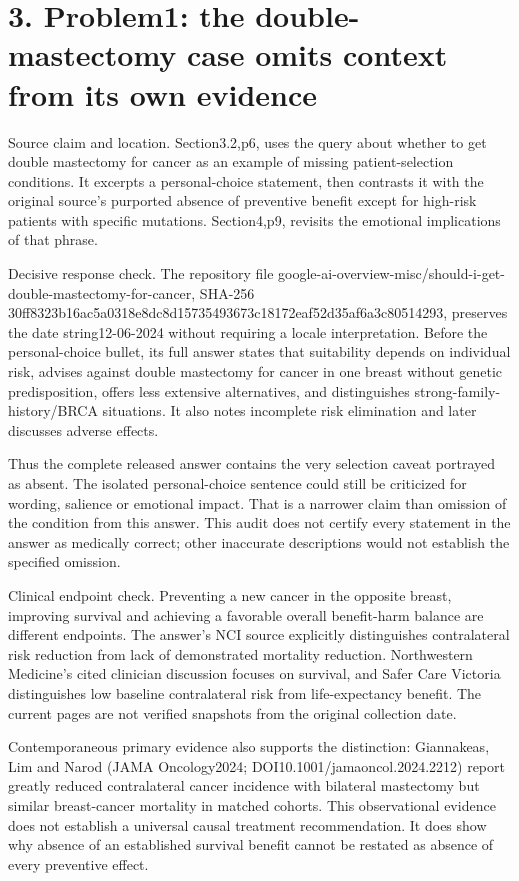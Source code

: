 \documentclass[10pt]{article}
\begin{document}
\section*{3. Problem1: the double-mastectomy case omits context from its own evidence}
Source claim and location. Section3.2,p6, uses the query about whether to get double mastectomy for cancer as an example of missing patient-selection conditions. It excerpts a personal-choice statement, then contrasts it with the original source’s purported absence of preventive benefit except for high-risk patients with specific mutations. Section4,p9, revisits the emotional implications of that phrase.\par
Decisive response check. The repository file google-ai-overview-misc/should-i-get-double-mastectomy-for-cancer, SHA-256 30ff8323b16ac5a0318e8dc8d15735493673c18172eaf52d35af6a3c80514293, preserves the date string12-06-2024 without requiring a locale interpretation. Before the personal-choice bullet, its full answer states that suitability depends on individual risk, advises against double mastectomy for cancer in one breast without genetic predisposition, offers less extensive alternatives, and distinguishes strong-family-history/BRCA situations. It also notes incomplete risk elimination and later discusses adverse effects.\par
Thus the complete released answer contains the very selection caveat portrayed as absent. The isolated personal-choice sentence could still be criticized for wording, salience or emotional impact. That is a narrower claim than omission of the condition from this answer. This audit does not certify every statement in the answer as medically correct; other inaccurate descriptions would not establish the specified omission.\par
Clinical endpoint check. Preventing a new cancer in the opposite breast, improving survival and achieving a favorable overall benefit-harm balance are different endpoints. The answer’s NCI source explicitly distinguishes contralateral risk reduction from lack of demonstrated mortality reduction. Northwestern Medicine’s cited clinician discussion focuses on survival, and Safer Care Victoria distinguishes low baseline contralateral risk from life-expectancy benefit. The current pages are not verified snapshots from the original collection date.\par
Contemporaneous primary evidence also supports the distinction: Giannakeas, Lim and Narod (JAMA Oncology2024; DOI10.1001/jamaoncol.2024.2212) report greatly reduced contralateral cancer incidence with bilateral mastectomy but similar breast-cancer mortality in matched cohorts. This observational evidence does not establish a universal causal treatment recommendation. It does show why absence of an established survival benefit cannot be restated as absence of every preventive effect.\par
\end{document}
